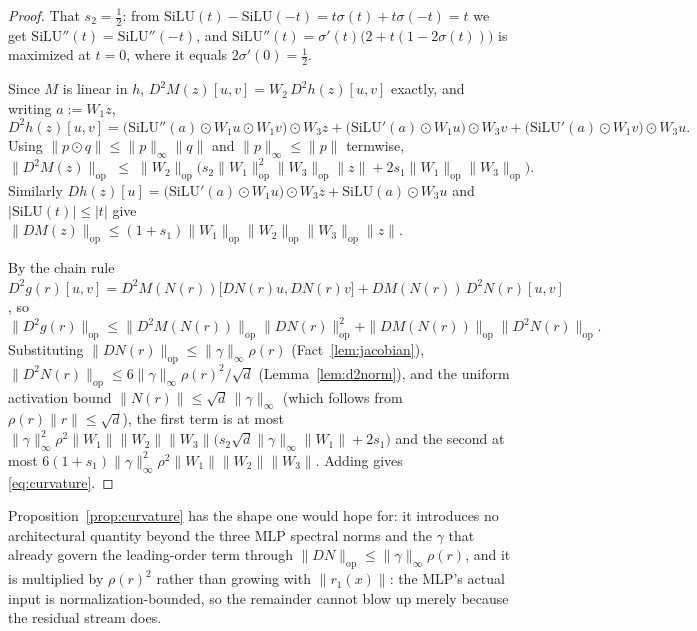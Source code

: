\documentclass[11pt,a4paper]{article}
\begin{document}
\begin{proof}
That $s_2=\tfrac12$: from $\mathrm{SiLU}(t)-\mathrm{SiLU}(-t)=t\sigma(t)+t\sigma(-t)=t$
we get $\mathrm{SiLU}''(t)=\mathrm{SiLU}''(-t)$, and
$\mathrm{SiLU}''(t)=\sigma'(t)\bigl(2+t(1-2\sigma(t))\bigr)$ is maximized at
$t=0$, where it equals $2\sigma'(0)=\tfrac12$.

Since $M$ is linear in $h$, $D^2M(z)[u,v]=W_2\,D^2h(z)[u,v]$ exactly, and
writing $a:=W_1z$,
\[
D^2h(z)[u,v]=\bigl(\mathrm{SiLU}''(a)\odot W_1u\odot W_1v\bigr)\odot W_3z
+\bigl(\mathrm{SiLU}'(a)\odot W_1u\bigr)\odot W_3v
+\bigl(\mathrm{SiLU}'(a)\odot W_1v\bigr)\odot W_3u .
\]
Using $\|p\odot q\|\le\|p\|_\infty\|q\|$ and $\|p\|_\infty\le\|p\|$ termwise,
\[
\|D^2M(z)\|_{\mathrm{op}}\;\le\;\|W_2\|_{\mathrm{op}}
\bigl(s_2\|W_1\|_{\mathrm{op}}^2\|W_3\|_{\mathrm{op}}\|z\|
+2s_1\|W_1\|_{\mathrm{op}}\|W_3\|_{\mathrm{op}}\bigr).
\]
Similarly
$Dh(z)[u]=\bigl(\mathrm{SiLU}'(a)\odot W_1u\bigr)\odot W_3z+\mathrm{SiLU}(a)\odot W_3u$
and $|\mathrm{SiLU}(t)|\le|t|$ give
$\|DM(z)\|_{\mathrm{op}}\le(1+s_1)\|W_1\|_{\mathrm{op}}\|W_2\|_{\mathrm{op}}\|W_3\|_{\mathrm{op}}\|z\|$.

By the chain rule
$D^2g(r)[u,v]=D^2M(N(r))\bigl[DN(r)u,DN(r)v\bigr]+DM(N(r))\,D^2N(r)[u,v]$, so
\[
\|D^2g(r)\|_{\mathrm{op}}\le\|D^2M(N(r))\|_{\mathrm{op}}\|DN(r)\|_{\mathrm{op}}^2
+\|DM(N(r))\|_{\mathrm{op}}\|D^2N(r)\|_{\mathrm{op}} .
\]
Substituting $\|DN(r)\|_{\mathrm{op}}\le\|\gamma\|_\infty\rho(r)$
(Fact~\ref{lem:jacobian}), $\|D^2N(r)\|_{\mathrm{op}}\le6\|\gamma\|_\infty\rho(r)^2/\sqrt d$
(Lemma~\ref{lem:d2norm}), and the uniform activation bound
$\|N(r)\|\le\sqrt d\,\|\gamma\|_\infty$ (which follows from
$\rho(r)\|r\|\le\sqrt d$), the first term is at most
$\|\gamma\|_\infty^2\rho^2\|W_1\|\|W_2\|\|W_3\|\bigl(s_2\sqrt d\|\gamma\|_\infty\|W_1\|+2s_1\bigr)$
and the second at most
$6(1+s_1)\|\gamma\|_\infty^2\rho^2\|W_1\|\|W_2\|\|W_3\|$. Adding gives
\eqref{eq:curvature}.
\end{proof}

Proposition~\ref{prop:curvature} has the shape one would hope for: it
introduces no architectural quantity beyond the three MLP spectral norms and
the $\gamma$ that already govern the leading-order term through
$\|DN\|_{\mathrm{op}}\le\|\gamma\|_\infty\rho(r)$, and it is multiplied by
$\rho(r)^2$ rather than growing with $\|r_1(x)\|$: the MLP's actual input is
normalization-bounded, so the remainder cannot blow up merely because the
residual stream does.
\end{document}
